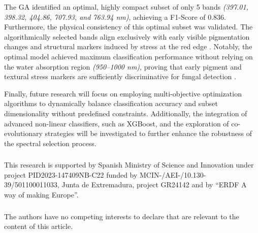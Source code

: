 \documentclass[runningheads]{llncs}
\begin{document}
The GA identified an optimal, highly compact subset of only 5 bands \textit{(397.01, 398.32, 404.86, 707.93, and 763.94 nm)}, achieving a F1-Score of 0.836. 
Furthermore, the physical consistency of this optimal subset was validated. The algorithmically selected bands align exclusively with early visible pigmentation changes and structural markers induced by stress at the red edge \cite{mahlein_plant_2016}. Notably, the optimal model achieved maximum classification performance without relying on the water absorption region \textit{(950–1000 nm)}, proving that early pigment and textural stress markers are sufficiently discriminative for fungal detection \cite{nicolai_nondestructive_2007}. 

Finally, future research will focus on employing multi-objective optimization algorithms to dynamically balance classification accuracy and subset dimensionality without predefined constraints. Additionally, the integration of advanced non-linear classifiers, such as XGBoost, and the exploration of co-evolutionary strategies will be investigated to further enhance the robustness of the spectral selection process.

\begin{credits}
\subsubsection{\ackname} This research is supported by Spanish Ministry of Science and Innovation under project PID2023-147409NB-C22 funded by MCIN-/AEI-/10.130-39/501100011033, Junta de Extremadura, project GR24142 and by “ERDF A way of making Europe”.

\subsubsection{\discintname}
The authors have no competing interests to declare that are
relevant to the content of this article.
\end{credits}



\end{document}

